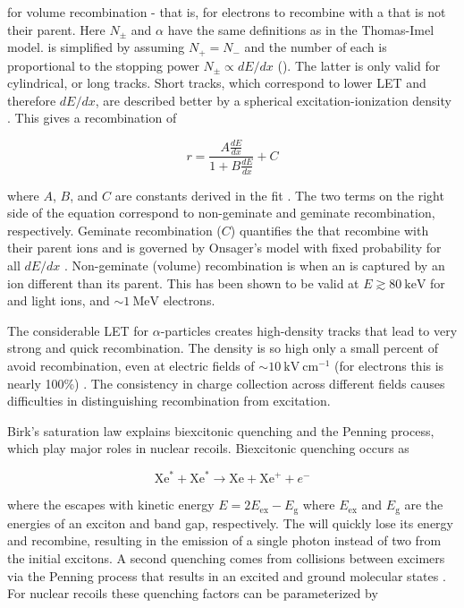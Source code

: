 \noindent for volume recombination - that is, for electrons to recombine with a  that is not their parent.  Here $N_{\pm}$ and
$\alpha$ have the same definitions as in the Thomas-Imel model.   is simplified by assuming
$N_{+} = N_{-}$ and the number of each is proportional to the stopping power $N_{\pm} \propto dE/dx$
().  The latter is only valid for
cylindrical, or long tracks.  Short tracks, which correspond to lower LET and therefore $dE/dx$, are described better by a spherical
excitation-ionization density .  This gives a recombination of

\begin{equation}
r = \frac{A \frac{dE}{dx}}{1 + B \frac{dE}{dx}} + C
\label{eq:birks_recomb}
\end{equation}

\noindent where $A$, $B$, and $C$ are constants derived in the fit .  The two terms on the right side of the equation
correspond to
non-geminate and geminate recombination, respectively.  Geminate recombination ($C$) quantifies the
\electron that recombine with their parent ions and is governed by Onsager's model with fixed probability for all $dE/dx$
.  Non-geminate
(volume) recombination is when an \electron is captured by an ion different than its parent.  This has been shown to be valid at
$E \gtrsim 80\ \mathrm{keV}$ for \gammarays and light ions, and ${\sim} 1\ \mathrm{MeV}$ electrons.

The considerable LET for $\alpha$-particles creates high-density tracks that lead to very strong and quick recombination.  The
density is so high only a small percent of \electron avoid recombination, even at electric fields of
${\sim} 10\ \mathrm{kV\ cm^{-1}}$
(for electrons this is nearly 100\%) .  The consistency in charge collection across different fields causes
difficulties in distinguishing recombination from excitation.

Birk's saturation law explains biexcitonic quenching and the Penning process, which play major roles in nuclear recoils.  Biexcitonic
quenching occurs as

\begin{equation}
\mathrm{Xe}^{*} + \mathrm{Xe}^{*} \rightarrow \mathrm{Xe} + \mathrm{Xe}^{+} + e^{-}
\label{eq:biexcitonic_again}
\end{equation}

\noindent where the \electron escapes with kinetic energy $E = 2E_{\mathrm{ex}} - E_{\mathrm{g}}$ where $E_{\mathrm{ex}}$ and
$E_{\mathrm{g}}$ are the energies of an exciton and band gap, respectively.  The \electron will quickly lose its energy and recombine,
resulting in the emission of a single photon instead of two from the initial excitons.  A second quenching comes from collisions between
excimers via the Penning process that results in an excited and ground molecular states .  For nuclear recoils these
quenching factors can be parameterized by

